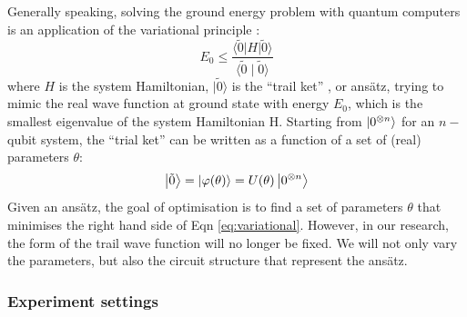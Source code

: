 \documentclass{ieeeaccess}
\begin{document}
  Generally speaking, solving the ground energy problem with quantum computers is an application of the variational principle \cite{sakurai_napolitano_2017}:
  \begin{equation}
  E_0 \leq \frac{\langle\tilde{0}|H| \tilde{0}\rangle}{\langle\tilde{0} \mid \tilde{0}\rangle} \label{eq:variational}
  \end{equation}
  where $H$ is the system Hamiltonian, $| \tilde{0}\rangle$ is the ``trail ket'' \cite{sakurai_napolitano_2017}, or ans\"atz, trying to mimic the real wave function at ground state with energy $E_0$, which is the smallest eigenvalue of the system Hamiltonian H. Starting from $\ket{0^{\otimes n}}$ for an $n-$qubit system, the ``trial ket'' can be written as a function of a set of (real) parameters $\theta$:
  \begin{equation}
      \ket{\tilde{0}} = \ket{\varphi (\theta)} = U(\theta)\ket{0^{\otimes n}}
  \end{equation}
  Given an ans\"atz, the goal of optimisation is to find a set of parameters $\theta$ that minimises the right hand side of Eqn \ref{eq:variational}. However, in our research, the form of the trail wave function will no longer be fixed. We will not only vary the parameters, but also the circuit structure that represent the ans\"atz.
  
\subsubsection{Experiment settings}
\end{document}
